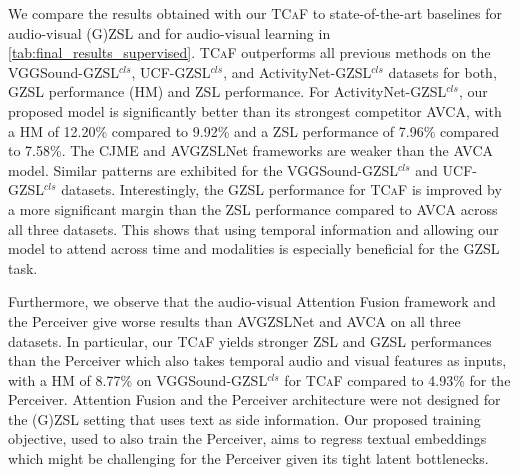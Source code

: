 \documentclass[runningheads]{llncs}
\newcommand{\mypara}[1]{\noindent{\bf{#1}}}
\newcommand{\modelName}{\textsc{TCaF}\xspace}
\newcommand{\activity}{{ActivityNet-GZSL$^{cls}$}\xspace}
\newcommand{\ucf}{{UCF-GZSL$^{cls}$}\xspace}
\newcommand{\vgg}{{VGGSound-GZSL$^{cls}$}\xspace}
\begin{document}
\mypara{Results.}
We compare the results obtained with our \modelName to state-of-the-art baselines for audio-visual (G)ZSL and for audio-visual learning in \cref{tab:final_results_supervised}.
\modelName outperforms all previous methods on the \vgg, \ucf, and \activity datasets for both, GZSL performance (HM) and ZSL performance.
For \activity, our proposed model is significantly better than its strongest competitor AVCA, with a HM of 12.20\% compared to 9.92\% and a ZSL performance of 7.96\% compared to 7.58\%. The CJME and AVGZSLNet frameworks are weaker than the AVCA model.
Similar patterns are exhibited for the \vgg and \ucf datasets.
Interestingly, the GZSL performance for \modelName{} is improved by a more significant margin than the ZSL performance compared to AVCA across all three datasets. This shows that using temporal information and allowing our model to attend across time and modalities is especially beneficial for the GZSL task. 

Furthermore, we observe that the audio-visual Attention Fusion framework and the Perceiver give worse results than AVGZSLNet and AVCA on all three datasets. 
In particular, our \modelName yields stronger ZSL and GZSL performances than the Perceiver which also takes temporal audio and visual features as inputs, with a HM of 8.77\% on \vgg for \modelName compared to 4.93\% for the Perceiver.
Attention Fusion and the Perceiver architecture were not designed for the (G)ZSL setting that uses text as side information. Our proposed training objective, used to also train the Perceiver, aims to regress textual embeddings which might be challenging for the Perceiver given its tight latent bottlenecks. 
\end{document}

